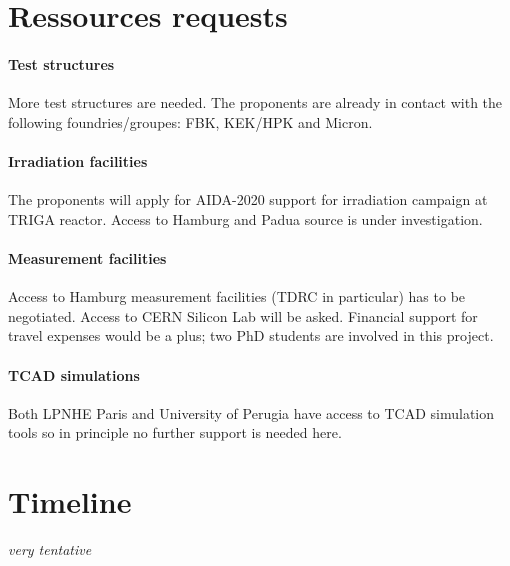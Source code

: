 \documentclass[dvips,12pt]{article}
\begin{document}
\section{Ressources requests}

\paragraph{Test structures}More test structures are needed. The proponents are already 
in contact with the following foundries/groupes: FBK, KEK/HPK and Micron.
\paragraph{Irradiation facilities}The proponents will apply for AIDA-2020 support for irradiation 
campaign at TRIGA reactor. Access to Hamburg and Padua source is under investigation.
\paragraph{Measurement facilities} Access to Hamburg measurement facilities (TDRC in 
particular) has to be negotiated. Access to CERN Silicon Lab will be asked. 
Financial support for travel expenses would be a plus; two 
PhD students are involved in this project.
\paragraph{TCAD simulations}Both LPNHE Paris and University of Perugia have access to 
TCAD simulation tools so in principle no further support is needed here.


\label{sec:ressources}

\section{Timeline}
\label{sec:timeline}
{\it very tentative}
\end{document}
